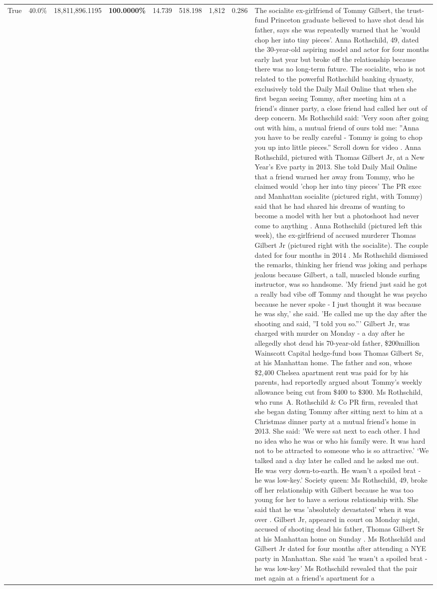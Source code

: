 \begin{table}[H]
\begin{tabular}{lllrlllll}
True & 40.0\% & 18,811,896.1195 & \bfseries \color{red} 100.0000\% & 14.739 & 518.198 & 1,812 & 0.286 & The socialite ex-girlfriend of Tommy Gilbert, the trust-fund Princeton graduate believed to have shot dead his father, says she was repeatedly warned that he 'would chop her into tiny pieces'. Anna Rothschild, 49, dated the 30-year-old aspiring model and actor for four months early last year but broke off the relationship because there was no long-term future. The socialite, who is not related to the powerful Rothschild banking dynasty, exclusively told the Daily Mail Online that when she first began seeing Tommy, after meeting him at a friend's dinner party, a close friend had called her out of deep concern. Ms Rothschild said: 'Very soon after going out with him, a mutual friend of ours told me: ''Anna you have to be really careful - Tommy is going to chop you up into little pieces.'' Scroll down for video . Anna Rothschild, pictured with Thomas Gilbert Jr, at a New Year's Eve party in 2013. She told Daily Mail Online that a friend warned her away from Tommy, who he claimed would 'chop her into tiny pieces' The PR exec and Manhattan socialite (pictured right, with Tommy) said that he had shared his dreams of wanting to become a model with her but a photoshoot had never come to anything . Anna Rothschild (pictured left this week), the ex-girlfriend of accused murderer Thomas Gilbert Jr (pictured right with the socialite). The couple dated for four months in 2014 . Ms Rothschild dismissed the remarks, thinking her friend was joking and perhaps jealous because Gilbert, a tall, muscled blonde surfing instructor, was so handsome. 'My friend just said he got a really bad vibe off Tommy and thought he was psycho because he never spoke - I just thought it was because he was shy,' she said. 'He called me up the day after the shooting and said, ''I told you so.''' Gilbert Jr, was charged with murder on Monday - a day after he allegedly shot dead his 70-year-old father, \$200million Wainscott Capital hedge-fund boss Thomas Gilbert Sr, at his Manhattan home. The father and son, whose \$2,400 Chelsea apartment rent was paid for by his parents, had reportedly argued about Tommy's weekly allowance being cut from \$400 to \$300. Ms Rothschild, who runs A. Rothschild \& Co PR firm, revealed that she began dating Tommy after sitting next to him at a Christmas dinner party at a mutual friend's home in 2013. She said: 'We were sat next to each other. I had no idea who he was or who his family were. It was hard not to be attracted to someone who is so attractive.' ‘We talked and a day later he called and he asked me out. He was very down-to-earth. He wasn’t a spoiled brat - he was low-key.’ Society queen: Ms Rothschild, 49, broke off her relationship with Gilbert because he was too young for her to have a serious relationship with. She said that he was 'absolutely devastated' when it was over . Gilbert Jr, appeared in court on Monday night, accused of shooting dead his father, Thomas Gilbert Sr at his Manhattan home on Sunday . Ms Rothschild and Gilbert Jr dated for four months after attending a NYE party in Manhattan. She said 'he wasn't a spoiled brat - he was low-key' Ms Rothschild revealed that the pair met again at a friend’s apartment for a 
\end{tabular}
\end{table}
